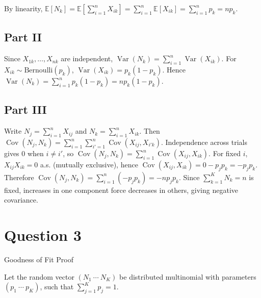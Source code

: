\documentclass[letterpaper]{article}
\begin{document}
		By linearity,
			$\mathbb{E}[N_k]=\mathbb{E}\!\left[\sum_{i=1}^n X_{ik}\right]=\sum_{i=1}^n \mathbb{E}[X_{ik}]=\sum_{i=1}^n p_k=np_k$.
		
		
			\subsection{Part II}
			
			Since $X_{1k},\ldots,X_{nk}$ are independent,
			$\operatorname{Var}(N_k)=\sum_{i=1}^n \operatorname{Var}(X_{ik})$.
			For $X_{ik}\sim \text{Bernoulli}(p_k)$,
			$\operatorname{Var}(X_{ik})=p_k(1-p_k)$.
			Hence $\operatorname{Var}(N_k)=\sum_{i=1}^n p_k(1-p_k)=np_k(1-p_k)$.
			
		
		\subsection{Part III}
			Write $N_j=\sum_{i=1}^n X_{ij}$ and $N_k=\sum_{i=1}^n X_{ik}$.
			Then $\operatorname{Cov}(N_j,N_k)=\sum_{i=1}^n\sum_{i'=1}^n \operatorname{Cov}(X_{ij},X_{i'k})$.
			Independence across trials gives $0$ when $i\neq i'$, so
			$\operatorname{Cov}(N_j,N_k)=\sum_{i=1}^n \operatorname{Cov}(X_{ij},X_{ik})$.
			For fixed $i$, $X_{ij}X_{ik}=0$ a.s. (mutually exclusive), hence
			$\operatorname{Cov}(X_{ij},X_{ik})=0-p_jp_k=-p_jp_k$.
			Therefore $\operatorname{Cov}(N_j,N_k)=\sum_{i=1}^n (-p_jp_k)=-np_jp_k$. Since $\sum_{k=1}^K N_k=n$ is fixed, increases in one component force decreases in others, giving negative covariance.
		
		\clearpage
		
		\section{Question 3}
		
		{\color{deepred}  Goodness of Fit Proof}
		
		Let the random vector $(N_1 \ \cdots \ N_K)$ be distributed multinomial with parameters $(p_1 \ \cdots \ p_K)$, such that $\sum_{j=1}^{K} p_j = 1$.
		
\end{document}
